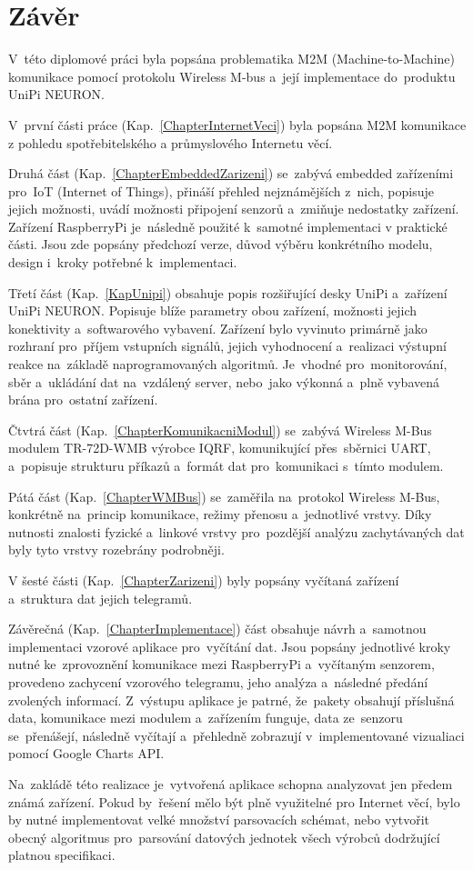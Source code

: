 \chapter{Závěr}

V~této diplomové práci byla popsána problematika M2M (Machine-to-Machine) komunikace pomocí protokolu Wireless M-bus a~její implementace do~produktu UniPi NEURON.


V~první části práce (Kap.~\ref{ChapterInternetVeci}) byla popsána M2M komunikace z pohledu spotřebitelského a průmyslového Internetu věcí.

Druhá část (Kap.~\ref{ChapterEmbeddedZarizeni}) se~zabývá embedded zařízeními pro~IoT (Internet of Things), přináší přehled nejznámějších z~nich, popisuje jejich možnosti, uvádí možnosti připojení senzorů a~zmiňuje nedostatky zařízení. Zařízení RaspberryPi je~následně použité k~samotné implementaci v praktické části. Jsou zde popsány předchozí verze, důvod výběru konkrétního modelu, design i~kroky potřebné k~implementaci.

Třetí část (Kap.~\ref{KapUnipi}) obsahuje popis rozšiřující desky UniPi a~zařízení UniPi NEURON. Popisuje blíže parametry obou zařízení, možnosti jejich konektivity a~softwarového vybavení. Zařízení bylo vyvinuto primárně jako rozhraní pro~příjem vstupních signálů, jejich vyhodnocení a~realizaci výstupní reakce na~základě naprogramovaných algoritmů. Je~vhodné pro~monitorování, sběr a~ukládání dat na~vzdálený server, nebo~jako výkonná a~plně vybavená brána pro~ostatní zařízení.

Čtvtrá část (Kap.~\ref{ChapterKomunikacniModul}) se~zabývá Wireless M-Bus modulem TR-72D-WMB výrobce IQRF, komunikující přes~sběrnici UART, a~popisuje strukturu příkazů a~formát dat pro~komunikaci s~tímto modulem.

Pátá část (Kap.~\ref{ChapterWMBus}) se~zaměřila na~protokol Wireless M-Bus, konkrétně na~princip komunikace, režimy přenosu a~jednotlivé vrstvy. 
Díky nutnosti znalosti fyzické a~linkové vrstvy pro~pozdější analýzu zachytávaných dat byly tyto vrstvy rozebrány podrobněji. 

V šesté části (Kap.~\ref{ChapterZarizeni}) byly popsány vyčítaná zařízení a~struktura dat jejich telegramů.

Závěrečná (Kap.~\ref{ChapterImplementace}) část obsahuje návrh a~samotnou implementaci vzorové aplikace pro~vyčítání dat. Jsou popsány jednotlivé kroky nutné ke~zprovoznění komunikace mezi RaspberryPi a~vyčítaným senzorem, provedeno zachycení vzorového telegramu, jeho analýza a~následné předání zvolených informací. Z~výstupu aplikace je patrné, že~pakety obsahují příslušná data, komunikace mezi modulem a~zařízením funguje, data ze~senzoru se~přenášejí, následně vyčítají a~přehledně zobrazují v~implementované vizualiaci pomocí Google Charts API.

Na~zakládě této realizace je~vytvořená aplikace schopna analyzovat jen předem známá zařízení. Pokud by~řešení mělo být plně využitelné pro Internet věcí, bylo by nutné implementovat velké množství parsovacích schémat, nebo vytvořit obecný algoritmus pro~parsování datových jednotek všech výrobců dodržující platnou specifikaci.



